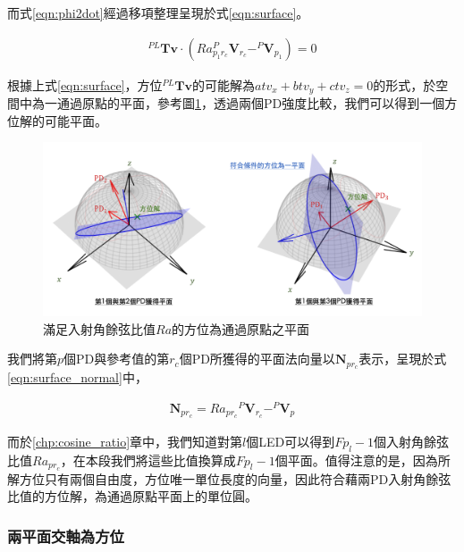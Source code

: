         而式\ref{eqn:phi2dot}經過移項整理呈現於式\ref{eqn:surface}。

            \begin{gather}
                 \label{eqn:surface}
                 ^{PL}\boldsymbol{Tv} \cdot(Ra_{p_1r_c} ^P\boldsymbol{V}_{r_c}-
                 ^P\boldsymbol{V}_{p_1})=0
            \end{gather}

        根據上式\ref{eqn:surface}，方位$^{PL}\boldsymbol{Tv}$的可能解為$atv_x+btv_y+ctv_z=0$的形式，於空間中為一通過原點的平面，參考圖\ref{pic:solve_surface}，透過兩個PD強度比較，我們可以得到一個方位解的可能平面。
       

       \begin{figure}[htpb]
        \centering
        \includegraphics[width=14cm]{ch3pic/solve_surface.png}
        \caption{滿足入射角餘弦比值$Ra$的方位為通過原點之平面}
        \label{pic:solve_surface}
        \end{figure}

         
        我們將第$p$個PD與參考值的第$r_c$個PD所獲得的平面法向量以$\boldsymbol{N}_{pr_c}$表示，呈現於式\ref{eqn:surface_normal}中，
        
        \begin{gather}
            \label{eqn:surface_normal}
            \boldsymbol{N}_{pr_c}  = {Ra_{pr_c}}{} ^P\boldsymbol{V}_{r_c}-
            ^P\boldsymbol{V}_{p}
       \end{gather}
        
        而於\ref{chp:cosine_ratio}章中，我們知道對第$l$個LED可以得到$Fp_l-1$個入射角餘弦比值$Ra_{pr_c}$，在本段我們將這些比值換算成$Fp_l-1$個平面。值得注意的是，因為所解方位只有兩個自由度，方位唯一單位長度的向量，因此符合藉兩PD入射角餘弦比值的方位解，為通過原點平面上的單位圓。


    \subsubsection{兩平面交軸為方位}
    \label{chp:solve_axis}


